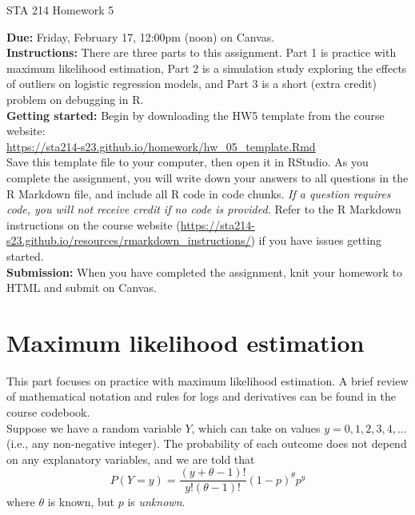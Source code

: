 \documentclass[11pt]{article}
\begin{document}
\begin{center}
\Large
STA 214 Homework 5\\
\normalsize
\vspace{5mm}
\end{center}

\noindent \textbf{Due:} Friday, February 17, 12:00pm (noon) on Canvas.\\ 

\noindent \textbf{Instructions:} There are three parts to this assignment. Part 1 is practice with maximum likelihood estimation, Part 2 is a simulation study exploring the effects of outliers on logistic regression models, and Part 3 is a short (extra credit) problem on debugging in R.\\

\noindent \textbf{Getting started:} Begin by downloading the HW5 template from the course website:\\

\url{https://sta214-s23.github.io/homework/hw_05_template.Rmd}\\

\noindent Save this template file to your computer, then open it in RStudio. As you complete the assignment, you will write down your answers to all questions in the R Markdown file, and include all R code in code chunks. \textit{If a question requires code, you will not receive credit if no code is provided.} Refer to the R Markdown instructions on the course website (\url{https://sta214-s23.github.io/resources/rmarkdown_instructions/}) if you have issues getting started.\\

\noindent \textbf{Submission:} When you have completed the assignment, knit your homework to HTML and submit on Canvas. 

\section{Maximum likelihood estimation}

This part focuses on practice with maximum likelihood estimation. A brief review of mathematical notation and rules for logs and derivatives can be found in the course codebook.\\

\noindent Suppose we have a random variable $Y$, which can take on values $y = 0, 1, 2, 3, 4,...$ (i.e., any non-negative integer). The probability of each outcome does not depend on any explanatory variables, and we are told that
$$P(Y = y) = \dfrac{(y + \theta  - 1)!}{y!(\theta - 1)!} (1 - p)^\theta p^y$$
where $\theta$ is known, but $p$ is \textit{unknown}. 
\end{document}
